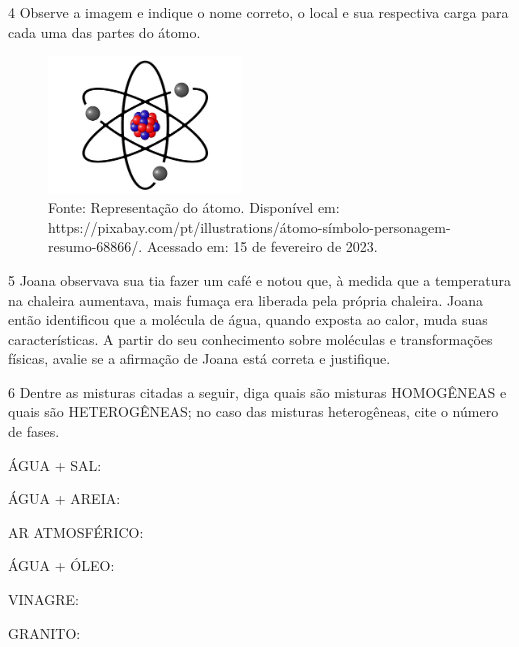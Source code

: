 \num{4}  Observe a imagem e indique o nome correto, o local e sua respectiva
  carga para cada uma das partes do átomo.

\begin{figure}[htpb!]
\includegraphics[width=2.02609in,height=1.43070in]{./imgs/img7.jpg}
\caption{Fonte: Representação do átomo. Disponível em: https://pixabay.com/pt/illustrations/átomo-símbolo-personagem-resumo-68866/. Acessado em: 15 de fevereiro de 2023.}
\end{figure}


\num{5} Joana observava sua tia fazer um café e notou que, à medida que a temperatura na chaleira aumentava, mais fumaça era liberada pela própria chaleira. Joana então identificou que a molécula de água, quando exposta ao calor, muda suas características. A partir do seu conhecimento sobre moléculas e transformações físicas, avalie se a afirmação de Joana está correta e justifique.
  


\num{6} Dentre as misturas citadas a
  seguir, diga quais são misturas HOMOGÊNEAS e quais são HETEROGÊNEAS; no caso das
  misturas heterogêneas, cite o número de fases.

\begin{escolha}
\item
  ÁGUA + SAL: 
\item
  ÁGUA + AREIA: 
\item
  AR ATMOSFÉRICO: 
\item
  ÁGUA + ÓLEO: 
\item
  VINAGRE: 
\item
  GRANITO: 
\end{escolha}

